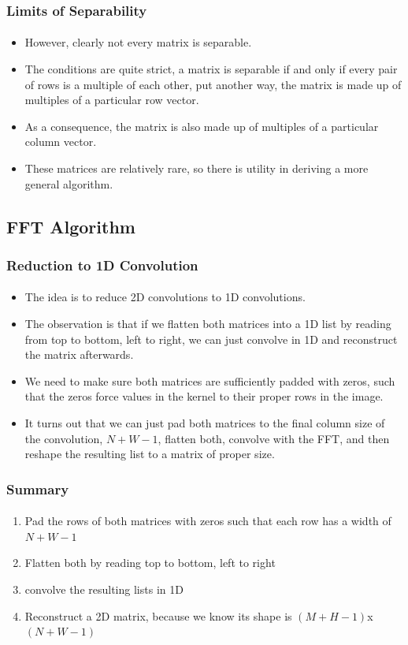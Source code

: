 \documentclass{beamer}                             %
\begin{document}
\begin{frame}
\frametitle{Limits of Separability}
\framesubtitle{}
\begin{itemize}
  \item However, clearly not every matrix is separable.
  \item The conditions are quite strict, a matrix is separable if and
    only if every pair of rows is a multiple of each other, put another
    way, the matrix is made up of multiples of a particular row vector.
  \item As a consequence, the matrix is also made
    up of multiples of a particular column vector.
  \item These matrices are relatively rare, so there
    is utility in deriving a more general algorithm.
\end{itemize}
\end{frame}

\subsection{FFT Algorithm}
\begin{frame}
\frametitle{Reduction to 1D Convolution}
\framesubtitle{}
\begin{itemize}[<+->]
  \item The idea is to reduce 2D convolutions to 1D convolutions.
  \item The observation is that if we \alert{flatten} both matrices
    into a 1D list by reading from top to bottom, left to right, we
    can just convolve in 1D and reconstruct the matrix afterwards.
  \item We need to make sure both matrices are sufficiently
    padded with zeros, such that the zeros force values
    in the kernel to their proper rows in the image.
  \item It turns out that we can just pad both matrices to the final column
    size of the convolution, \( N + W - 1 \), flatten both, convolve with
    the FFT, and then reshape the resulting list to a matrix of proper size.
\end{itemize} 
\end{frame}

\begin{frame}
\frametitle{Summary}
\framesubtitle{}
\begin{enumerate}[<+->]
  \item Pad the rows of both matrices with zeros such that
    each row has a width of \( N + W - 1 \)
  \item Flatten both by reading top to bottom, left to right
  \item convolve the resulting lists in 1D
  \item Reconstruct a 2D matrix, because we know its shape is
    \( (M + H - 1) \)x\( (N + W - 1) \)
\end{enumerate}
\end{frame}
\end{document}
